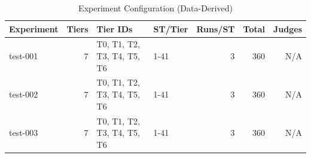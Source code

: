 \begin{table}[htbp]
\centering
\caption{Experiment Configuration (Data-Derived)}
\label{tab:experiment_config}
\small
\begin{tabular}{lrllrrr}
\toprule
Experiment & Tiers & Tier IDs & ST/Tier & Runs/ST & Total & Judges \\
\midrule
test-001 & 7 & T0, T1, T2, T3, T4, T5, T6 & 1-41 & 3 & 360 & N/A \\
test-002 & 7 & T0, T1, T2, T3, T4, T5, T6 & 1-41 & 3 & 360 & N/A \\
test-003 & 7 & T0, T1, T2, T3, T4, T5, T6 & 1-41 & 3 & 360 & N/A \\
\bottomrule
\end{tabular}
\end{table}
